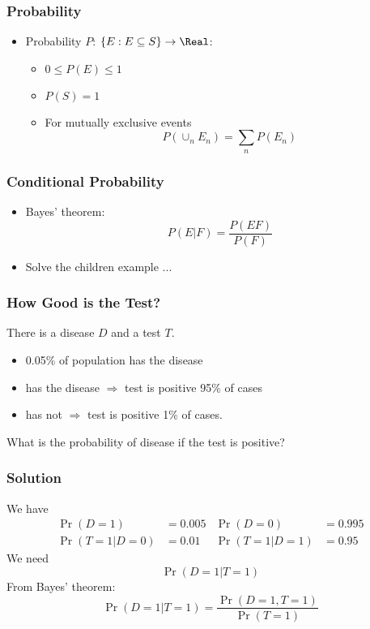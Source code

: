 \documentclass[mathserif, xcolor=table, svgnames]{beamer}
\begin{document}
\begin{frame}
\frametitle{Probability}
\begin{itemize}
\item Probability $P$: $\{E : E \subseteq S\} \rightarrow \Real$:
  \begin{itemize}
  \item $0 \le P(E) \le 1$
  \item $P(S) = 1$
  \item For mutually exclusive events
    \begin{equation}
      P \left( \cup_{n} E_{n} \right)
      =
      \sum_{n} P(E_{n})
    \end{equation}
  \end{itemize}
\end{itemize}
\end{frame}

\begin{frame}
  \frametitle{Conditional Probability}
  \begin{itemize}
  \item Bayes' theorem:
    \begin{equation*}
      P(E|F) = \frac{P(EF)}{P(F)}
    \end{equation*}
  \item Solve the children example ...
  \end{itemize}
\end{frame}

\begin{frame}
  \frametitle{How Good is the Test?}
  There is a disease $D$ and a test $T$.
  \begin{itemize}
  \item 0.05\% of population has the disease
  \item has the disease $\Rightarrow$ test is positive 95\% of
    cases
  \item has not $\Rightarrow$ test is positive 1\% of cases.
  \end{itemize}
  What is the probability of disease if the test is positive?
\end{frame}

\begin{frame}
  \frametitle{Solution}
  We have
  \begin{align*}
    \Pr(D = 1) & = 0.005 & \Pr(D = 0) &= 0.995 \\
    \Pr(T=1|D=0) &= 0.01 & \Pr(T=1|D=1) &= 0.95
  \end{align*}
  We need
  \begin{equation*}
    \Pr(D=1|T=1)
  \end{equation*}
  From Bayes' theorem:
  \begin{equation*}
    \Pr(D=1|T=1)
    =
    \frac{\Pr(D=1, T=1)}{\Pr(T=1)}
  \end{equation*}
\end{frame}
\end{document}
